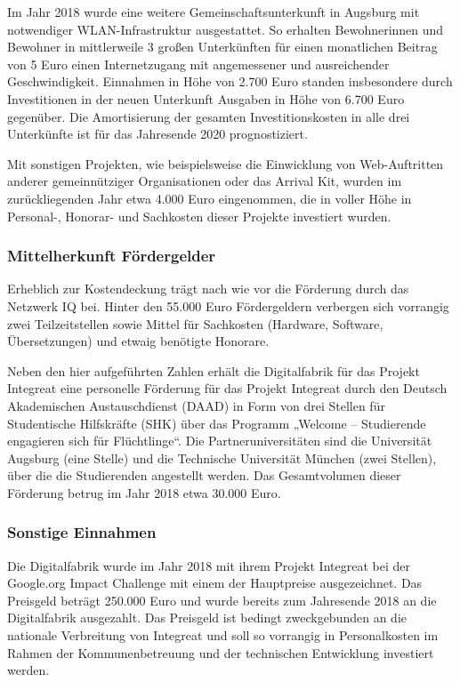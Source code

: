 \documentclass[12pt, a4paper]{article} %
\begin{document}
Im Jahr 2018 wurde eine weitere Gemeinschaftsunterkunft in Augsburg mit
notwendiger WLAN-Infrastruktur ausgestattet. So erhalten Bewohnerinnen
und Bewohner in mittlerweile 3 großen Unterkünften für einen monatlichen
Beitrag von 5 Euro einen Internetzugang mit angemessener und
ausreichender Geschwindigkeit. Einnahmen in Höhe von 2.700 Euro standen
insbesondere durch Investitionen in der neuen Unterkunft Ausgaben in
Höhe von 6.700 Euro gegenüber. Die Amortisierung der gesamten
Investitionskosten in alle drei Unterkünfte ist für das Jahresende 2020
prognostiziert.

Mit sonstigen Projekten, wie beispielsweise die Einwicklung von
Web-Auftritten anderer gemeinnütziger Organisationen oder das Arrival
Kit, wurden im zurückliegenden Jahr etwa 4.000 Euro eingenommen, die in
voller Höhe in Personal-, Honorar- und Sachkosten dieser Projekte
investiert wurden.

\hypertarget{mittelherkunft-fuxf6rdergelder}{%
\subsubsection{Mittelherkunft
Fördergelder}\label{mittelherkunft-fuxf6rdergelder}}

Erheblich zur Kostendeckung trägt nach wie vor die Förderung durch das
Netzwerk IQ bei. Hinter den 55.000 Euro Fördergeldern verbergen sich
vorrangig zwei Teilzeitstellen sowie Mittel für Sachkosten (Hardware,
Software, Übersetzungen) und etwaig benötigte Honorare.

Neben den hier aufgeführten Zahlen erhält die Digitalfabrik für das
Projekt Integreat eine personelle Förderung für das Projekt Integreat
durch den Deutsch Akademischen Austauschdienst (DAAD) in Form von drei
Stellen für Studentische Hilfskräfte (SHK) über das Programm „Welcome –
Studierende engagieren sich für Flüchtlinge“. Die Partneruniversitäten
sind die Universität Augsburg (eine Stelle) und die Technische
Universität München (zwei Stellen), über die die Studierenden angestellt
werden. Das Gesamtvolumen dieser Förderung betrug im Jahr 2018 etwa
30.000 Euro.

\hypertarget{sonstige-einnahmen}{%
\subsubsection{Sonstige Einnahmen}\label{sonstige-einnahmen}}

Die Digitalfabrik wurde im Jahr 2018 mit ihrem Projekt Integreat bei der
Google.org Impact Challenge mit einem der Hauptpreise ausgezeichnet. Das
Preisgeld beträgt 250.000 Euro und wurde bereits zum Jahresende 2018 an
die Digitalfabrik ausgezahlt. Das Preisgeld ist bedingt zweckgebunden an
die nationale Verbreitung von Integreat und soll so vorrangig in
Personalkosten im Rahmen der Kommunenbetreuung und der technischen
Entwicklung investiert werden.
\end{document}
